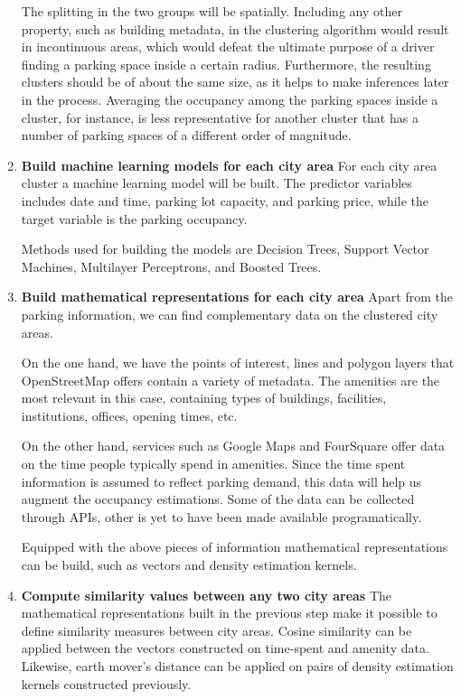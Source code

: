 \documentclass{ws-ijait}
\begin{document}
\begin{enumerate}[label=\Roman*]
		The splitting in the two groups will be spatially. Including any other property, such as building metadata, in the clustering algorithm would result in incontinuous areas, which would defeat the ultimate purpose of a driver finding a parking space inside a certain radius. Furthermore, the resulting clusters should be of about the same size, as it helps to make inferences later in the process. Averaging the occupancy among the parking spaces inside a cluster, for instance, is less representative for another cluster that has a number of parking spaces of a different order of magnitude.		
		
		\item{\textbf{Build machine learning models for each city area}}
		For each city area cluster a machine learning model will be built. The predictor variables includes date and time, parking lot capacity, and parking price, while the target variable is the parking occupancy. 
		
		Methods used for building the models are Decision Trees, Support Vector Machines, Multilayer Perceptrons, and Boosted Trees.
		
		\item{\textbf{Build mathematical representations for each city area}}
		Apart from the parking information, we can find complementary data on the clustered city areas. 
		
		On the one hand, we have the points of interest, lines and polygon layers that OpenStreetMap offers contain a variety of metadata. The amenities are the most relevant in this case, containing types of buildings, facilities, institutions, offices, opening times, etc. 
		
		On the other hand, services such as Google Maps and FourSquare offer data on the time people typically spend in amenities. Since the time spent information is assumed to reflect parking demand, this data will help us augment the occupancy estimations. Some of the data can be collected through APIs, other is yet to have been made available programatically.  
		
		Equipped with the above pieces of information mathematical representations can be build, such as vectors and density estimation kernels.  		
		
		\item{\textbf{Compute similarity values between any two city areas}}
		The mathematical representations built in the previous step make it possible to define similarity measures between city areas. Cosine similarity can be applied between the vectors constructed on time-spent and amenity data. Likewise, earth mover's distance can be applied on pairs of density estimation kernels constructed previously.
		

\end{enumerate}
\end{document}
